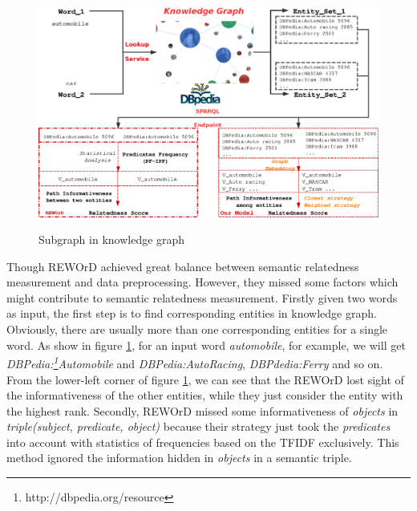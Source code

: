 \begin{figure}
    \flushleft
    \includegraphics[width=1.0\textwidth]{pic/overview.eps}\\
    \caption{Subgraph in knowledge graph}
    \label{overview}
\end{figure}

Though REWOrD\cite{aaai/Pirro12} achieved great balance between
semantic relatedness measurement and data preprocessing.
However, they missed some factors which might contribute to semantic relatedness measurement. 
Firstly given two words as input, the first step is to find corresponding entities in knowledge graph.
Obviously, there are usually more than one corresponding entities for a single word.
As show in figure \ref{overview}, for an input word \emph{automobile}, for example, 
we will get \emph{DBPedia:\footnote{http://dbpedia.org/resource}Automobile} and
\emph{DBPedia:Auto\underline{\hspace{0.5em}}Racing}, \emph{DBPdedia:Ferry} and so on.
From the lower-left corner of figure \ref{overview}, we can see that the REWOrD lost sight of
the informativeness of the other entities, while they just consider the entity with the highest rank.
Secondly, REWOrD missed some informativeness of \emph{objects} in \emph{triple(subject, predicate, object)}
because their strategy just took the \emph{predicates} into account with statistics of frequencies based on the TFIDF exclusively.
This method ignored the information hidden in \emph{objects} in a semantic triple.

